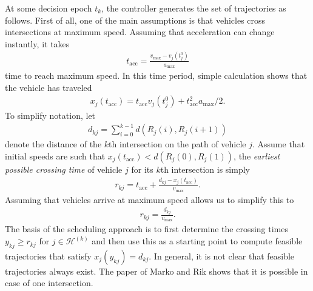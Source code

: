 \documentclass{article}
\theoremstyle{definition}
\theoremstyle{plain}
\begin{document}
At some decision epoch $t_{k}$, the controller generates the set of trajectories
as follows.
First of all, one of the main assumptions is that vehicles cross intersections at maximum speed.
Assuming that acceleration can change instantly, it takes
\begin{align}
  t_{\text{acc}} = \frac{v_{\text{max}} - v_{j}(t_{j}^{0})}{a_{\text{max}}}
\end{align}
time to reach maximum speed. In this time period, simple calculation shows that the vehicle has traveled
\begin{align}
  x_{j}(t_{\text{acc}}) = t_{\text{acc}} v_{j}(t_{j}^{0}) + t_{\text{acc}}^{2} a_{\text{max}} / 2 .
\end{align}
To simplify notation, let
\begin{align}
  d_{kj} = \sum_{i=0}^{k-1} d(R_{j}(i), R_{j}(i+1))
\end{align}
denote the distance of the $k$th intersection on the path of vehicle $j$.
Assume that initial speeds are such that
$x_{j}(t_{\text{acc}}) < d(R_{j}(0), R_{j}(1))$, the \textit{earliest possible
  crossing time} of vehicle $j$ for its $k$th intersection is simply
\begin{align}
  r_{kj} = t_{\text{acc}} + \frac{d_{kj} - x_{j}(t_{\text{acc}})}{v_{\text{max}}} .
\end{align}
Assuming that vehicles arrive at maximum speed allows us to simplify this to
\begin{align}
  r_{kj} = \frac{d_{kj}}{v_{\text{max}}} .
\end{align}
The basis of the scheduling approach is to first determine the crossing times
$y_{kj} \geq r_{kj}$ for $j \in \mathcal{H}^{(k)}$ and then use this as a
starting point to compute feasible trajectories that satisfy
$x_{j}(y_{kj}) = d_{kj}$. In general, it is not clear that feasible trajectories
always exist. The paper of Marko and Rik shows that it is possible in case of
one intersection.





\end{document}
